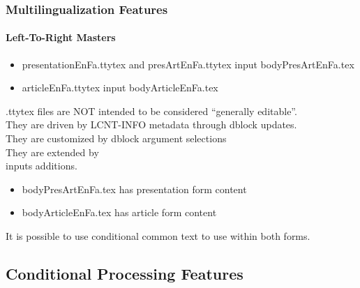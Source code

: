 \begin{frame}[fragile,label=MultilingualizationFeatures]
    \frametitle{Multilingualization Features}
    \framesubtitle{Left-To-Right Masters}

    
    \begin{itemize}
    \item presentationEnFa.ttytex and presArtEnFa.ttytex input bodyPresArtEnFa.tex
    \item articleEnFa.ttytex input bodyArticleEnFa.tex
    \end{itemize}

    .ttytex files are NOT intended to be considered ``generally editable''.\\
    They are driven by LCNT-INFO metadata through dblock updates.\\
    They are customized by dblock argument selections\\
    They are extended by \\inputs additions.

    \begin{itemize}
    \item bodyPresArtEnFa.tex has presentation form content
    \item bodyArticleEnFa.tex has article form content
    \end{itemize}

    It is possible to use conditional common text to use within both forms.
    
\end{frame}



\begin{comment}
**  [[elisp:(org-cycle)][| ]] [[elisp:(org-show-subtree)][|=]] [[elisp:(show-children 10)][|V]] [[elisp:(bx:orgm:indirectBufOther)][|>]] [[elisp:(bx:orgm:indirectBufMain)][|I]] [[elisp:(blee:ppmm:org-mode-toggle)][|N]] [[elisp:(org-top-overview)][|O]] [[elisp:(progn (org-shifttab) (org-content))][|C]] [[elisp:(delete-other-windows)][|1]]  /Subsection/   Conditional Processing Features ::  [[elisp:(org-cycle)][| ]]
\end{comment}

\subsection{Conditional Processing Features}


